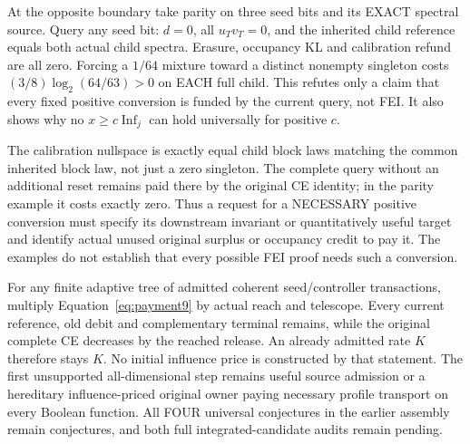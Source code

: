 \documentclass[11pt]{article}
\begin{document}
At the opposite boundary take parity on three seed bits and its EXACT
spectral source. Query any seed bit: $d=0$, all $u_Tv_T=0$, and
the inherited child reference equals both actual child spectra.
Erasure, occupancy KL and calibration refund are all zero.
Forcing a $1/64$ mixture toward a distinct nonempty singleton costs
$(3/8)\log_2(64/63)>0$ on EACH full child. This refutes only a
claim that every fixed positive conversion is funded by the current
query, not FEI. It also shows why no $x\ge c\operatorname{Inf}_j$
can hold universally for positive $c$.

The calibration nullspace is exactly equal child block laws matching
the common inherited block law, not just a zero singleton. The
complete query without an additional reset remains paid there by
the original CE identity; in the parity example it costs exactly zero.
Thus a request for a NECESSARY positive conversion must specify its
downstream invariant or quantitatively useful target and identify
actual unused original surplus or occupancy credit to pay it.
The examples do not establish that every possible FEI proof needs
such a conversion.

For any finite adaptive tree of admitted coherent seed/controller
transactions, multiply Equation~\eqref{eq:payment9} by actual reach
and telescope. Every current reference, old debit and complementary
terminal remains, while the original complete CE decreases by the
reached release. An already admitted rate $K$ therefore stays $K$.
No initial influence price is constructed by that statement.
The first unsupported all-dimensional step remains useful source
admission or a hereditary influence-priced original owner paying
necessary profile transport on every Boolean function. All FOUR
universal conjectures in the earlier assembly remain conjectures,
and both full integrated-candidate audits remain pending.
\end{document}
